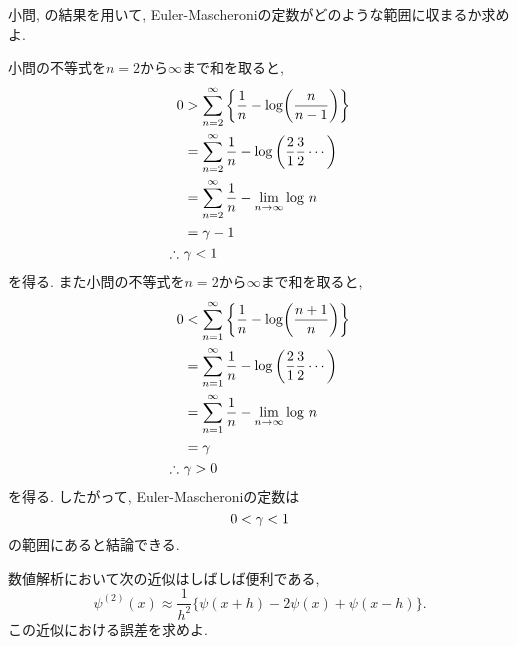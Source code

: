 \begin{qparts}
\begin{qlist}
            \qitem 小問, の結果を用いて, Euler-Mascheroniの定数がどのような範囲に収まるか求めよ. 

            小問の不等式を$n=2$から$\infty$まで和を取ると, 
            \begin{align}
                0 &> \sum_{n=2}^{\infty}\qty{\frac{1}{n}-\mathrm{log}\qty(\frac{n}{n-1})} \notag \\
                &= \sum_{n=2}^{\infty}\frac{1}{n}-\mathrm{log}\left(\frac{2}{1}\frac{3}{2}\cdots\right) \notag \\
                &= \sum_{n=2}^{\infty}\frac{1}{n}-\lim_{n\to\infty}\mathrm{log}\ n \notag \\
                &= \gamma -1 \notag \\
                \therefore\ &\gamma<1 \notag
            \end{align}
            を得る. また小問の不等式を$n=2$から$\infty$まで和を取ると, 
            \begin{align}
                0 &< \sum_{n=1}^{\infty}\qty{\frac{1}{n}-\mathrm{log}\qty(\frac{n+1}{n})} \notag \\
                &= \sum_{n=1}^{\infty}\frac{1}{n}-\mathrm{log}\left(\frac{2}{1}\frac{3}{2}\cdots\right) \notag \\
                &= \sum_{n=1}^{\infty}\frac{1}{n}-\lim_{n\to\infty}\mathrm{log}\ n \notag \\
                &= \gamma \notag \\
                \therefore\ &\gamma>0 \notag
            \end{align}
            を得る. したがって, Euler-Mascheroniの定数は
            \begin{equation}
                0<\gamma<1 \notag
            \end{equation}
            の範囲にあると結論できる. 
        \end{qlist}

    \qpart 数値解析において次の近似はしばしば便利である, 
    \begin{equation}
        \psi^{(2)}(x) \approx \frac{1}{h^2}\lbrace\psi(x+h)-2\psi(x)+\psi(x-h)\rbrace .
    \end{equation}
    この近似における誤差を求めよ. 


\end{qparts}
